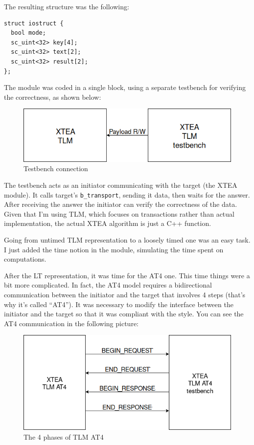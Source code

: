 \documentclass[]{IEEEtran}
\begin{document}
The resulting structure was the following:
\begin{verbatim}
struct iostruct {
  bool mode;
  sc_uint<32> key[4];
  sc_uint<32> text[2];
  sc_uint<32> result[2];
};
\end{verbatim}
The module was coded in a single block, using a separate testbench for verifying the correctness, as shown below:
\begin{figure}[H]
\centering
\includegraphics[width=1\linewidth]{figures/xtea_testbench_tlm.png}
\caption{Testbench connection}
\label{fig:xteatestbenchtlm}
\end{figure}

The testbench acts as an initiator communicating with the target (the XTEA module). It calls target's \texttt{b\_transport}, sending it data,
then waits for the answer.
After receiving the answer the initiator can verify the correctness of the data.
Given that I'm using TLM, which focuses on transactions rather than actual implementation, the actual XTEA algorithm is just a C++ function.

Going from untimed TLM representation to a loosely timed one was an easy task. I just added the time notion in the module, simulating the time
spent on computations.

After the LT representation, it was time for the AT4 one. This time things were a bit more complicated. In fact, the AT4 model requires a bidirectional
communication between the initiator and the target that involves 4 steps (that's why it's called ``AT4'').
It was necessary to modify the interface between the initiator and the target so that it was compliant with the style.
You can see the AT4 communication in the following picture:
\begin{figure}[H]
\centering
\includegraphics[width=1\linewidth]{figures/xtea_tlm_at4.png}
\caption{The 4 phases of TLM AT4}
\label{fig:xteatlmat4}
\end{figure}
\end{document}
